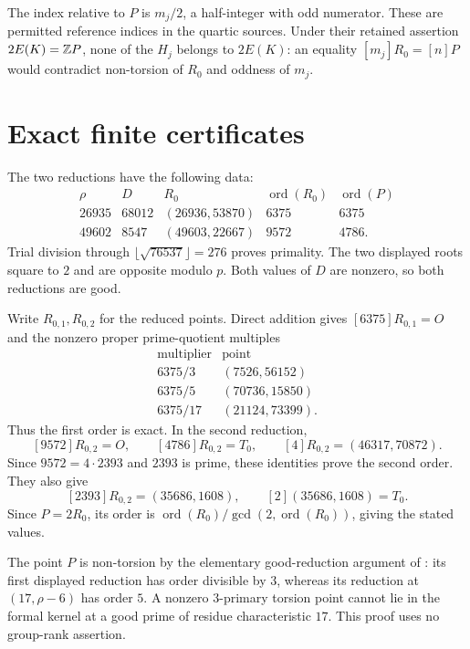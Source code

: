 \documentclass[11pt,a4paper]{article}
\begin{document}
The index relative to $P$ is $m_j/2$, a half-integer with odd numerator.
These are permitted reference indices in the quartic sources.
Under their retained assertion $2E(K)=\mathbb Z P$, none of the $H_j$
belongs to $2E(K)$: an equality $[m_j]R_0=[n]P$ would contradict
non-torsion of $R_0$ and oddness of $m_j$.

\section{Exact finite certificates}

The two reductions have the following data:
\[
\begin{array}{c|r|r|r|r}
 \rho&D&R_0&\operatorname{ord}(R_0)&\operatorname{ord}(P)\\\hline
 26935&68012&(26936,53870)&6375&6375\\
 49602&8547 &(49603,22667)&9572&4786.
\end{array}
\]
Trial division through $\lfloor\sqrt{76537}\rfloor=276$ proves
primality. The two displayed roots square to $2$ and are opposite
modulo $p$. Both values of $D$ are nonzero, so both reductions are good.

Write $R_{0,1},R_{0,2}$ for the reduced points. Direct addition gives
$[6375]R_{0,1}=O$ and the nonzero proper prime-quotient multiples
\[
\begin{array}{c|r}
 \text{multiplier}&\text{point}\\\hline
 6375/3 &(7526,56152)\\
 6375/5 &(70736,15850)\\
 6375/17&(21124,73399).
\end{array}
\]
Thus the first order is exact. In the second reduction,
\[
 [9572]R_{0,2}=O,\qquad
 [4786]R_{0,2}=T_0,\qquad
 [4]R_{0,2}=(46317,70872).
\]
Since $9572=4\cdot2393$ and $2393$ is prime, these identities prove
the second order. They also give
\begin{equation}\label{eq:quarter}
 [2393]R_{0,2}=(35686,1608),\qquad
 [2](35686,1608)=T_0.
\end{equation}
Since $P=2R_0$, its order is
$\operatorname{ord}(R_0)/\gcd(2,\operatorname{ord}(R_0))$,
giving the stated values.

The point $P$ is non-torsion by the elementary good-reduction argument
of \cite[Lemma~2.1]{Mixed}: its first displayed reduction has order
divisible by $3$, whereas its reduction at $(17,\rho-6)$ has order
$5$. A nonzero $3$-primary torsion point cannot lie in the formal
kernel at a good prime of residue characteristic $17$.
This proof uses no group-rank assertion.
\end{document}
